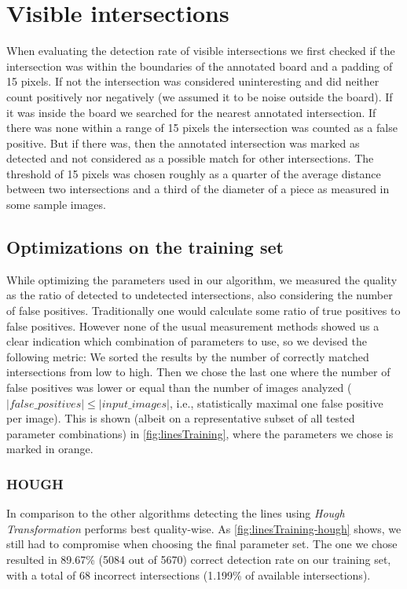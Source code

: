 	\section{Visible intersections}
	\label{evaluation-visible}
	When evaluating the detection rate of visible intersections we first checked if the intersection was within the boundaries of the annotated board and a padding of 15 pixels. If not the intersection was considered uninteresting and did neither count positively nor negatively (we assumed it to be noise outside the board). If it was inside the board we searched for the nearest annotated intersection. If there was none within a range of 15 pixels the intersection was counted as a false positive. But if there was, then the annotated intersection was marked as detected and not considered as a possible match for other intersections. The threshold of 15 pixels was chosen roughly as a quarter of the average distance between two intersections and a third of the diameter of a piece as measured in some sample images.

	

	\subsection{Optimizations on the training set}
	\label{evaluation-visible-optimization}
	While optimizing the parameters used in our algorithm, we measured the quality as the ratio of detected to undetected intersections, also considering the number of false positives. Traditionally one would calculate some ratio of true positives to false positives. However none of the usual measurement methods showed us a clear indication which combination of parameters to use, so we devised the following metric: We sorted the results by the number of correctly matched intersections from low to high. Then we chose the last one where the number of false positives was lower or equal than the number of images analyzed ($|false\_positives| \leq |input\_images|$, i.e., statistically maximal one false positive per image). This is shown (albeit on a representative subset of all tested parameter combinations) in \autoref{fig:linesTraining}, where the parameters we chose is marked in orange.

	\subsubsection{HOUGH}
	\label{evaluation-visible-optimization-hough}
	In comparison to the other algorithms detecting the lines using \emph{Hough Transformation} performs best quality-wise. As \autoref{fig:linesTraining-hough} shows, we still had to compromise when choosing the final parameter set. The one we chose resulted in 89.67\% (5084 out of 5670) correct detection rate on our training set, with a total of 68 incorrect intersections (1.199\% of available intersections).

